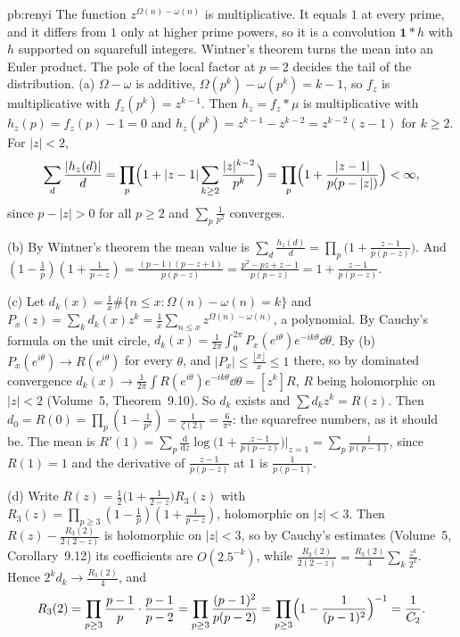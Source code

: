 \begin{solution}{pb:renyi}
\idea The function $z^{\Omega(n)-\omega(n)}$ is multiplicative. It equals $1$ at every prime, and it differs from $1$ only at higher prime powers, so it is a convolution $\mathbf1*h$ with $h$ supported on squarefull integers. Wintner's theorem turns the mean into an Euler product. The pole of the local factor at $p=2$ decides the tail of the distribution.
\writeup (a) $\Omega-\omega$ is additive, $\Omega(p^k)-\omega(p^k)=k-1$, so $f_z$ is multiplicative with $f_z(p^k)=z^{k-1}$. Then $h_z=f_z*\mu$ is multiplicative with
$h_z(p)=f_z(p)-1=0$ and $h_z(p^k)=z^{k-1}-z^{k-2}=z^{k-2}(z-1)$ for $k\ge2$. For $|z|<2$,
\[
\sum_d\frac{|h_z(d)|}d=\prod_p\Bigl(1+|z-1|\sum_{k\ge2}\frac{|z|^{k-2}}{p^k}\Bigr)=\prod_p\Bigl(1+\frac{|z-1|}{p(p-|z|)}\Bigr)<\infty,
\]
since $p-|z|>0$ for all $p\ge2$ and $\sum_p\frac1{p^2}$ converges.

(b) By Wintner's theorem the mean value is $\sum_d\frac{h_z(d)}d=\prod_p\bigl(1+\frac{z-1}{p(p-z)}\bigr)$. And
$(1-\frac1p)(1+\frac1{p-z})=\frac{(p-1)(p-z+1)}{p(p-z)}=\frac{p^2-pz+z-1}{p(p-z)}=1+\frac{z-1}{p(p-z)}$.

(c) Let $d_k(x)=\frac1x\#\{n\le x:\Omega(n)-\omega(n)=k\}$ and $P_x(z)=\sum_kd_k(x)z^k=\frac1x\sum_{n\le x}z^{\Omega(n)-\omega(n)}$, a polynomial. By Cauchy's formula on the unit circle,
$d_k(x)=\frac1{2\pi}\int_0^{2\pi}P_x(e^{i\theta})e^{-ik\theta}\dd\theta$. By (b) $P_x(e^{i\theta})\to R(e^{i\theta})$ for every $\theta$, and $|P_x|\le\frac{\lfloor x\rfloor}x\le1$ there, so by dominated
convergence $d_k(x)\to\frac1{2\pi}\int R(e^{i\theta})e^{-ik\theta}\dd\theta=[z^k]R$, $R$ being holomorphic on $|z|<2$ (Volume~5, Theorem~9.10). So $d_k$ exists and $\sum d_kz^k=R(z)$.
Then $d_0=R(0)=\prod_p(1-\frac1{p^2})=\frac1{\zeta(2)}=\frac6{\pi^2}$: the squarefree numbers, as it should be. The mean is $R'(1)=\sum_p\frac{\mathrm d}{\mathrm dz}\log\bigl(1+\frac{z-1}{p(p-z)}\bigr)\big|_{z=1}=\sum_p\frac1{p(p-1)}$,
since $R(1)=1$ and the derivative of $\frac{z-1}{p(p-z)}$ at $1$ is $\frac1{p(p-1)}$.

(d) Write $R(z)=\frac12\bigl(1+\frac1{2-z}\bigr)R_3(z)$ with $R_3(z)=\prod_{p\ge3}(1-\frac1p)(1+\frac1{p-z})$, holomorphic on $|z|<3$. Then
$R(z)-\frac{R_3(2)}{2(2-z)}$ is holomorphic on $|z|<3$, so by Cauchy's estimates (Volume~5, Corollary~9.12) its coefficients are $O(2.5^{-k})$, while $\frac{R_3(2)}{2(2-z)}=\frac{R_3(2)}4\sum_k\frac{z^k}{2^k}$. Hence
$2^kd_k\to\frac{R_3(2)}4$, and
\[
R_3(2)=\prod_{p\ge3}\frac{p-1}p\cdot\frac{p-1}{p-2}=\prod_{p\ge3}\frac{(p-1)^2}{p(p-2)}=\prod_{p\ge3}\Bigl(1-\frac1{(p-1)^2}\Bigr)^{-1}=\frac1{C_2}.
\]


\end{solution}

